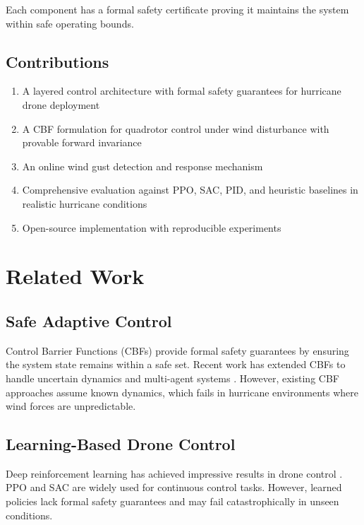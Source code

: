\documentclass[10pt,twocolumn]{article}
\begin{document}
Each component has a formal safety certificate proving it maintains the system within safe operating bounds.

\subsection{Contributions}

\begin{enumerate}
    \item A layered control architecture with formal safety guarantees for hurricane drone deployment
    \item A CBF formulation for quadrotor control under wind disturbance with provable forward invariance
    \item An online wind gust detection and response mechanism
    \item Comprehensive evaluation against PPO, SAC, PID, and heuristic baselines in realistic hurricane conditions
    \item Open-source implementation with reproducible experiments
\end{enumerate}

\section{Related Work}

\subsection{Safe Adaptive Control}

Control Barrier Functions (CBFs) \cite{ames2014control} provide formal safety guarantees by ensuring the system state remains within a safe set. Recent work has extended CBFs to handle uncertain dynamics \cite{taylor2020control} and multi-agent systems \cite{wang2021safe}. However, existing CBF approaches assume known dynamics, which fails in hurricane environments where wind forces are unpredictable.

\subsection{Learning-Based Drone Control}

Deep reinforcement learning has achieved impressive results in drone control \cite{loquercio2021learning,kaufmann2023bevy}. PPO \cite{schulman2017proximal} and SAC \cite{haarnoja2018soft} are widely used for continuous control tasks. However, learned policies lack formal safety guarantees and may fail catastrophically in unseen conditions.
\end{document}

